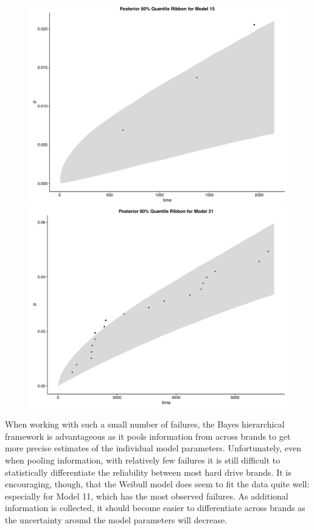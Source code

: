 \documentclass{scrartcl}
\begin{document}
\begin{figure}[H]
  \centering
  \begin{minipage}[b]{0.4\textwidth}
    \includegraphics[width=\textwidth]{plot3.pdf}
  \end{minipage}
  \hfill
  \begin{minipage}[b]{0.4\textwidth}
    \includegraphics[width=\textwidth]{plot4.pdf}
  \end{minipage}
\end{figure}

\noindent When working with such a small number of failures, the Bayes hierarchical framework is advantageous as it pools information from across brands to get more precise estimates of the individual model parameters.  Unfortunately, even when pooling information, with relatively few failures it is still difficult to statistically differentiate the reliability between most hard drive brands. It is encouraging, though, that the Weibull model does seem to fit the data quite well: especially for Model 11, which has the most observed failures.  As additional information is collected, it should become easier to differentiate across brands as the uncertainty around the model parameters will decrease.\\ 
\end{document}
